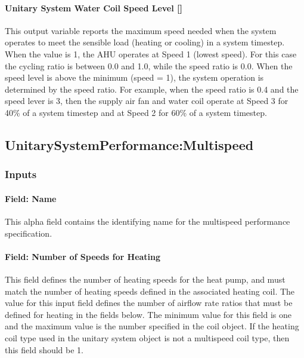 \paragraph{Unitary System Water Coil Speed Level {[]}}\label{unitary-system-water-coil-speed-level}

This output variable reports the maximum speed needed when the system operates to meet the sensible load (heating or cooling) in a system timestep. When the value is 1, the AHU operates at Speed 1 (lowest speed). For this case the cycling ratio is between 0.0 and 1.0, while the speed ratio is 0.0. When the speed level is above the minimum (speed = 1), the system operation is determined by the speed ratio. For example, when the speed ratio is 0.4 and the speed lever is 3, then the supply air fan and water coil operate at Speed 3 for 40\% of a system timestep and at Speed 2 for 60\% of a system timestep.

\subsection{UnitarySystemPerformance:Multispeed}\label{unitarysystemperformancemultispeed}

\subsubsection{Inputs}\label{inputs-1-046}

\paragraph{Field: Name}\label{field-name-1-045}

This alpha field contains the identifying name for the multispeed performance specification.

\paragraph{Field: Number of Speeds for Heating}\label{field-number-of-speeds-for-heating}

This field defines the number of heating speeds for the heat pump, and must match the number of heating speeds defined in the associated heating coil. The value for this input field defines the number of airflow rate ratios that must be defined for heating in the fields below. The minimum value for this field is one and the maximum value is the number specified in the coil object. If the heating coil type used in the unitary system object is not a multispeed coil type, then this field should be 1.

